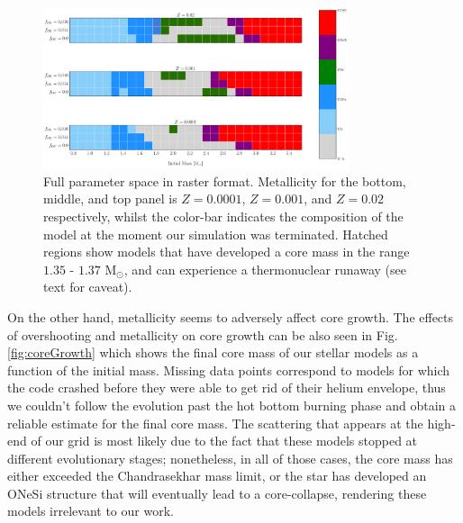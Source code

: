 \documentclass[../../main/thesis_msc.tex]{subfiles}
\begin{document}
    
   \begin{figure}[ht]
        \centering
        \includegraphics[width=0.8\textwidth]{../figures/chapter4/parameterSpaceRaster.png}
        \caption{Full parameter space in raster format. Metallicity for the bottom, middle, and top panel is $Z=0.0001$, $Z=0.001$, and $Z=0.02$ respectively, whilst the color-bar indicates the composition of the model at the moment our simulation was terminated. Hatched regions show models that have developed a core mass in the range $1.35$ - $1.37$ M$_{\odot}$, and can experience a thermonuclear runaway (see text for caveat).}
        \label{fig:parameterSpace}
    \end{figure}
    
    On the other hand, metallicity seems to adversely affect core growth. The effects of overshooting and metallicity on core growth can be also seen in Fig.\,\ref{fig:coreGrowth} which shows the final core mass of our stellar models as a function of the initial mass. Missing data points correspond to models for which the code crashed before they were able to get rid of their helium envelope, thus we couldn't follow the evolution past the hot bottom burning phase and obtain a reliable estimate for the final core mass. The scattering that appears at the high-end of our grid is most likely due to the fact that these models stopped at different evolutionary stages; nonetheless, in all of those cases, the core mass has either exceeded the Chandrasekhar mass limit, or the star has developed an ONeSi structure that will eventually lead to a core-collapse, rendering these models irrelevant to our work.
    
\end{document}
